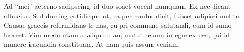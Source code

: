 Ad “mei” aeterno sadipscing, id duo sonet vocent numquam.
Ex nec dicant albucius. Sed doming cotidieque at, ea per modus dicit, fuisset adipisci mel te.
Causae graecis reformidans te has, cu pri commune salutandi, eum id sumo laoreet.
Vim modo utamur aliquam an, mutat rebum integre ex nec, qui id munere iracundia constituam.
At nam quis assum veniam.	

